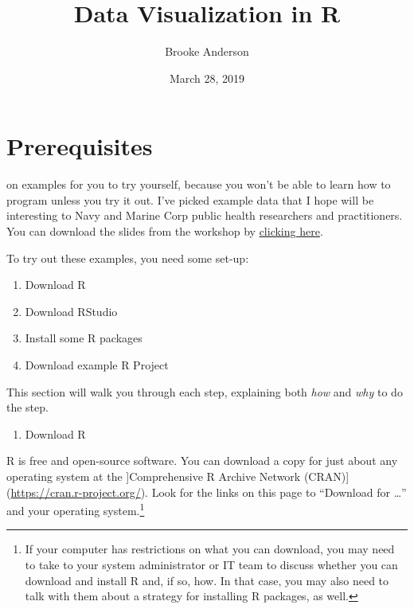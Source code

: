 \documentclass[]{tufte-book}
\title{Data Visualization in R}
\author{Brooke Anderson}
\date{March 28, 2019}
\providecommand{\tightlist}{%
  \setlength{\itemsep}{0pt}\setlength{\parskip}{0pt}}
\begin{document}
\maketitle



{
\setcounter{tocdepth}{1}
\tableofcontents
}

\hypertarget{prerequisites}{%
\chapter{Prerequisites}\label{prerequisites}}

 on examples for you to try yourself,
because you
won't be able to learn how to program unless you try it out. I've picked
example data that I hope will be interesting to Navy and Marine Corp public
health researchers and practitioners. You can download the slides from the
workshop by \href{https://github.com/geanders/navy_public_health/raw/master/_workshop_slides/workshop_slides.pdf}{clicking here}.

To try out these examples, you need some set-up:

\begin{enumerate}
\def\labelenumi{\arabic{enumi}.}
\tightlist
\item
  Download R
\item
  Download RStudio
\item
  Install some R packages
\item
  Download example R Project
\end{enumerate}

This section will walk you through each step, explaining both \emph{how} and
\emph{why} to do the step.

\begin{enumerate}
\def\labelenumi{\arabic{enumi}.}
\tightlist
\item
  Download R
\end{enumerate}

R is free and open-source software. You can download a copy for just about any
operating system at the {]}Comprehensive R Archive Network (CRAN){]} (\url{https://cran.r-project.org/}).
Look for the links on this page to ``Download for \ldots{}'' and your operating system.\footnote{If your computer has restrictions on what you can download, you may need to take to your
  system administrator or IT team to discuss whether you can download and install R and, if
  so, how. In that case, you may also need to talk with them about a strategy for installing
  R packages, as well.}
\end{document}

